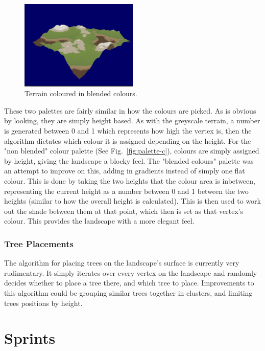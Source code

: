 \documentclass[a4paper,10pt]{report}
\begin{document}
\begin{figure}[ht!]
    \centering
  \includegraphics[width=0.5\textwidth]{Images/Screenshots/palette-b.png}
 \caption{Terrain coloured in blended colours.}
 \label{fig:palette-b}
\end{figure}

These two palettes are fairly similar in how the colours are picked. As is obvious by looking, they are simply height based. As with the greyscale terrain, a number is generated between 0 and 1 which represents how high the vertex is, then the algorithm dictates which colour it is assigned depending on the height. For the "non blended" colour palette (See Fig.~\ref{fig:palette-c}), colours are simply assigned by height, giving the landscape a blocky feel. The "blended colours" palette was an attempt to improve on this, adding in gradients instead of simply one flat colour. This is done by taking the two heights that the colour area is inbetween, representing the current height as a number between 0 and 1 between the two heights (similar to how the overall height is calculated). This is then used to work out the shade between them at that point, which then is set as that vertex's colour. This provides the landscape with a more elegant feel. 

\subsection{Tree Placements}
The algorithm for placing trees on the landscape's surface is currently very rudimentary. It simply iterates over every vertex on the landscape and randomly decides whether to place a tree there, and which tree to place. Improvements to this algorithm could be grouping similar trees together in clusters, and limiting trees positions by height. 



\chapter{Sprints}
\end{document}
